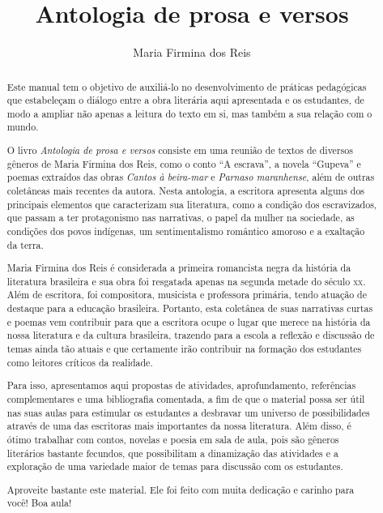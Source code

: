 \documentclass[12pt]{extarticle}
\begin{document}
\newcommand{\AutorLivro}{Maria Firmina dos Reis}
\newcommand{\TituloLivro}{Antologia de prosa e versos}
\newcommand{\Tema}{Ficção, mistério e fantasia}
\newcommand{\Genero}{Conto; crônica, novela e poema}
\newcommand{\imagemCapa}{./images/PNLD0014-01.png}
\newcommand{\issnppub}{---}
\newcommand{\issnepub}{---}
\newcommand{\colaborador}{{Rodrigo Jorge Ribeiro Neves}}


\title{\TituloLivro}
\author{\AutorLivro}
\def\authornotes{\colaborador}

\date{}
\maketitle


\begin{abstract}

Este manual tem o objetivo de auxiliá-lo no desenvolvimento de práticas
pedagógicas que estabeleçam o diálogo entre a obra literária aqui
apresentada e os estudantes, de modo a ampliar não apenas a leitura do
texto em si, mas também a sua relação com o mundo.

O livro \emph{Antologia de prosa e versos} consiste em uma reunião de
textos de diversos gêneros de Maria Firmina dos Reis, como o conto ``A
escrava'', a novela ``Gupeva'' e poemas extraídos das obras \emph{Cantos
à beira-mar} e \emph{Parnaso maranhense}, além de outras coletâneas mais
recentes da autora. Nesta antologia, a escritora apresenta alguns dos
principais elementos que caracterizam sua literatura, como a condição
dos escravizados, que passam a ter protagonismo nas narrativas, o papel
da mulher na sociedade, as condições dos povos indígenas, um
sentimentalismo romântico amoroso e a exaltação da terra.

Maria Firmina dos Reis é considerada a primeira romancista negra da
história da literatura brasileira e sua obra foi resgatada apenas na
segunda metade do século \textsc{xx}. Além de escritora, foi compositora,
musicista e professora primária, tendo atuação de destaque para a
educação brasileira. Portanto, esta coletânea de suas narrativas curtas
e poemas vem contribuir para que a escritora ocupe o lugar que merece na
história da nossa literatura e da cultura brasileira, trazendo para a
escola a reflexão e discussão de temas ainda tão atuais e que certamente
irão contribuir na formação dos estudantes como leitores críticos da
realidade.

Para isso, apresentamos aqui propostas de atividades, aprofundamento,
referências complementares e uma bibliografia comentada, a fim de que o
material possa ser útil nas suas aulas para estimular os estudantes a
desbravar um universo de possibilidades através de uma das escritoras
mais importantes da nossa literatura. Além disso, é ótimo trabalhar com
contos, novelas e poesia em sala de aula, pois são gêneros literários
bastante fecundos, que possibilitam a dinamização das atividades e a
exploração de uma variedade maior de temas para discussão com os
estudantes.

Aproveite bastante este material. Ele foi feito com muita dedicação e
carinho para você! Boa aula!
\end{abstract}
\end{document}
